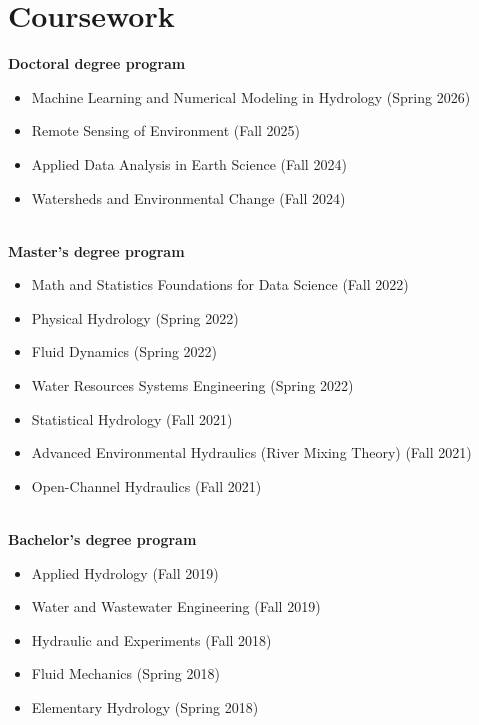 \section{Coursework}
\textbf{Doctoral degree program}

\begin{itemize}
    \item Machine Learning and Numerical Modeling in Hydrology (Spring 2026) 
    \item Remote Sensing of Environment (Fall 2025)
    \item Applied Data Analysis in Earth Science (Fall 2024)
    \item Watersheds and Environmental Change (Fall 2024)
\end{itemize}
\\
\textbf{Master’s degree program}

\begin{itemize}
    \item Math and Statistics Foundations for Data Science (Fall 2022)
    \item Physical Hydrology (Spring 2022)
    \item Fluid Dynamics (Spring 2022)
    \item Water Resources Systems Engineering (Spring 2022)
    \item Statistical Hydrology (Fall 2021)
    \item Advanced Environmental Hydraulics (River Mixing Theory) (Fall 2021)
    \item Open-Channel Hydraulics (Fall 2021)
\end{itemize}
\\
\textbf{Bachelor’s degree program}
\begin{itemize}
    \item Applied Hydrology (Fall 2019)
    \item Water and Wastewater Engineering (Fall 2019)
    \item Hydraulic and Experiments (Fall 2018)
    \item Fluid Mechanics (Spring 2018)
    \item Elementary Hydrology (Spring 2018)
\end{itemize}


